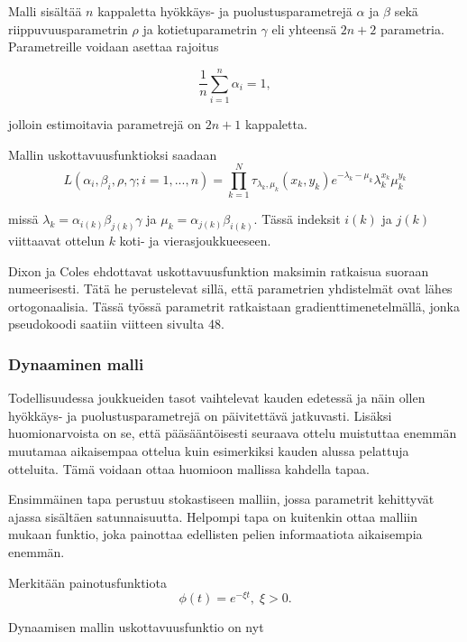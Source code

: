 \documentclass[a4paper,finnish,titlepage,12pt]{article}
\begin{document}
Malli sisältää $n$ kappaletta hyökkäys- ja puolustusparametrejä $\alpha$ ja $\beta$ sekä riippuvuusparametrin $\rho$ ja kotietuparametrin $\gamma$ eli yhteensä $2n+2$ parametria. Parametreille voidaan asettaa rajoitus

\begin{equation}
	\frac{1}{n} \sum_{i=1}^{n} \alpha_i = 1,
\end{equation}

jolloin estimoitavia parametrejä on $2n+1$ kappaletta.

Mallin uskottavuusfunktioksi saadaan
\begin{equation}
	L(\alpha_i, \beta_i, \rho, \gamma; i=1,...,n) = \prod_{k=1}^{N} \tau_{\lambda_k, \mu_k} (x_k, y_k) e^{-\lambda_k - \mu_k} \lambda_k^{x_k} 			\mu_k^{y_k}
\end{equation}

missä $\lambda_k = \alpha_{i(k)} \beta_{j(k)} \gamma$ ja $\mu_k = \alpha_{j(k)} \beta_{i(k)}$. Tässä indeksit $i(k)$ ja $j(k)$ viittaavat ottelun $k$ koti- ja vierasjoukkueeseen.

Dixon ja Coles ehdottavat uskottavuusfunktion maksimin ratkaisua suoraan numeerisesti. Tätä he perustelevat sillä, että parametrien yhdistelmät ovat lähes ortogonaalisia.
Tässä työssä parametrit ratkaistaan gradienttimenetelmällä, jonka pseudokoodi saatiin viitteen \cite{olesen} sivulta 48.




\subsubsection{Dynaaminen malli}
Todellisuudessa joukkueiden tasot vaihtelevat kauden edetessä ja näin ollen hyökkäys- ja puolustusparametrejä on päivitettävä jatkuvasti. 
Lisäksi huomionarvoista on se, että pääsääntöisesti seuraava ottelu muistuttaa enemmän muutamaa aikaisempaa ottelua kuin esimerkiksi kauden alussa pelattuja otteluita. Tämä voidaan ottaa huomioon mallissa kahdella tapaa.

Ensimmäinen tapa perustuu stokastiseen malliin, jossa parametrit kehittyvät ajassa sisältäen satunnaisuutta. Helpompi tapa on kuitenkin ottaa malliin mukaan funktio, joka painottaa edellisten pelien informaatiota aikaisempia enemmän.

Merkitään painotusfunktiota
\begin{equation}
	\phi (t) = e^{-\xi t}, \; \xi > 0.
\end{equation}

Dynaamisen mallin uskottavuusfunktio on nyt
\end{document}
